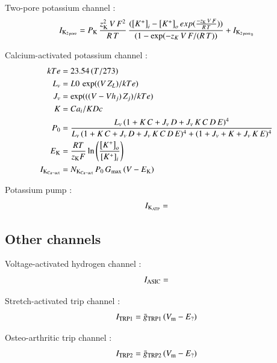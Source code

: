 Two-pore potassium channel \citep{UNKNOWN}:
\begin{equation}
 I_{\rm K_{2\, pore}} = P_{\rm K}\, \frac{z_{\rm K}^2\, V\, F^{2}}{R\,
   T}\, \frac{({\left[K^{+}\right]_{i}} - {\left[K^{+}\right]_{o}}\,
 exp(\frac{-z_{\rm K}\, V\, F}{R\, T}))}{(1 - \exp(-z_K\, V\, F/(R\,
 T))} + I_{{\rm K_{2\, pore}}_0}
\end{equation}

Calcium-activated potassium channel \citep{HorriganAldrich2002}:
\begin{equation}
  \begin{split}
    kTe & = 23.54\, (T/273)\\
    L_v & = L0\, \exp((V\, Z_L)/kTe)\\
    J_v & = \exp(((V - Vh_j)\, Z_j)/kTe)\\
    K & = Ca_i/KDc\\
    P_0 & = \frac{L_v\, (1+K\, C+J_v\, D+J_v\, K\, C\, D\, E)^4}
    {L_v\, (1+K\, C+J_v\, D+J_v\, K\, C\, D\, E)^4 +
      (1+J_v+K+J_v\, K\, E)^4}\\
    E_{\rm K} & =  \frac{R T}{z_{\rm K} F}
    \ln\left(\frac{\left[K^{+}\right]_{o}}
      {\left[K^{+}\right]_{i}}\right)\\
    I_{\rm K_{Ca-act}} & = N_{\rm K_{Ca-act}}\, P_0\, G_{\rm max}\, (V -
    E_{\rm K})
  \end{split}
\end{equation}

Potassium pump \citep{UNKNOWN}:
\begin{equation}
  I_{\rm K_{ATP}} =
\end{equation}

\subsection{Other channels}
\label{sec:other-channels}

Voltage-activated hydrogen channel \citep{UNKNOWN}:
\begin{equation}
  I_{\rm ASIC} =
\end{equation}

Stretch-activated trip channel \citep{UNKNOWN}:
\begin{equation}
  I_{\rm TRP1} = \bar{g}_{\rm TRP1}\, (V_{\rm m} - E_{\rm ?})
\end{equation}

Osteo-arthritic trip channel \citep{UNKNOWN}:
\begin{equation}
  I_{\rm TRP2} = \bar{g}_{\rm TRP2}\, (V_{\rm m} - E_{\rm ?})
\end{equation}

